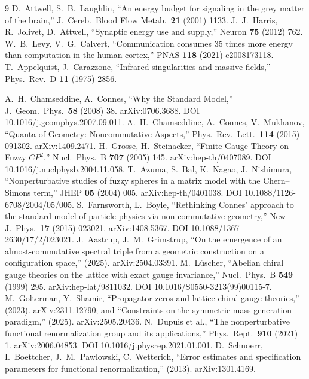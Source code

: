 \documentclass[12pt,a4paper,twoside]{article}
\theoremstyle{plain}
\theoremstyle{definition}
\theoremstyle{remark}
\begin{document}
\begin{thebibliography}{9}
D.~Attwell, S.~B.~Laughlin, ``An energy budget for signaling in the grey matter of the brain,'' J.\ Cereb.\ Blood Flow Metab.\ \textbf{21} (2001) 1133.
J.~J.~Harris, R.~Jolivet, D.~Attwell, ``Synaptic energy use and supply,'' Neuron \textbf{75} (2012) 762.
W.~B.~Levy, V.~G.~Calvert, ``Communication consumes 35 times more energy than computation in the human cortex,'' PNAS \textbf{118} (2021) e2008173118.
T.~Appelquist, J.~Carazzone, ``Infrared singularities and massive fields,'' Phys.\ Rev.\ D \textbf{11} (1975) 2856.

A.~H.~Chamseddine, A.~Connes, ``Why the Standard Model,'' J.\ Geom.\ Phys.\ \textbf{58} (2008) 38. arXiv:0706.3688. DOI 10.1016/j.geomphys.2007.09.011.
A.~H.~Chamseddine, A.~Connes, V.~Mukhanov, ``Quanta of Geometry: Noncommutative Aspects,'' Phys.\ Rev.\ Lett.\ \textbf{114} (2015) 091302. arXiv:1409.2471.
H.~Grosse, H.~Steinacker, ``Finite Gauge Theory on Fuzzy $CP^2$,'' Nucl.\ Phys.\ B \textbf{707} (2005) 145. arXiv:hep-th/0407089. DOI 10.1016/j.nuclphysb.2004.11.058.
T.~Azuma, S.~Bal, K.~Nagao, J.~Nishimura, ``Nonperturbative studies of fuzzy spheres in a matrix model with the Chern--Simons term,'' JHEP \textbf{05} (2004) 005. arXiv:hep-th/0401038. DOI 10.1088/1126-6708/2004/05/005.
S.~Farnsworth, L.~Boyle, ``Rethinking Connes' approach to the standard model of particle physics via non-commutative geometry,'' New J.\ Phys.\ \textbf{17} (2015) 023021. arXiv:1408.5367. DOI 10.1088/1367-2630/17/2/023021.
J.~Aastrup, J.~M.~Grimstrup, ``On the emergence of an almost-commutative spectral triple from a geometric construction on a configuration space,'' (2025). arXiv:2504.03391.
M.~L\"uscher, ``Abelian chiral gauge theories on the lattice with exact gauge invariance,'' Nucl.\ Phys.\ B \textbf{549} (1999) 295. arXiv:hep-lat/9811032. DOI 10.1016/S0550-3213(99)00115-7.
M.~Golterman, Y.~Shamir, ``Propagator zeros and lattice chiral gauge theories,'' (2023). arXiv:2311.12790; and ``Constraints on the symmetric mass generation paradigm,'' (2025). arXiv:2505.20436.
N.~Dupuis et al., ``The nonperturbative functional renormalization group and its applications,'' Phys.\ Rept.\ \textbf{910} (2021) 1. arXiv:2006.04853. DOI 10.1016/j.physrep.2021.01.001.
D.~Schnoerr, I.~Boettcher, J.~M.~Pawlowski, C.~Wetterich, ``Error estimates and specification parameters for functional renormalization,'' (2013). arXiv:1301.4169.


\end{thebibliography}
\end{document}
